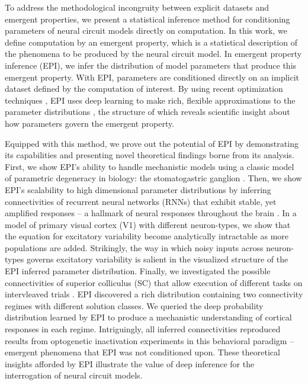 \documentclass[11pt]{article}
\begin{document}
To address the methodological incongruity between explicit datasets and emergent properties, we present a statistical inference method for conditioning parameters of neural circuit models directly on computation.
In this work, we define computation by an emergent property, which is a statistical description of the phenomena to be produced by the neural circuit model.
In emergent property inference (EPI), we infer the distribution of model parameters that produce this emergent property.
With EPI, parameters are conditioned directly on an implicit dataset defined by the computation of interest.
By using recent optimization techniques \cite{loaiza2017maximum}, EPI uses deep learning to make rich, flexible approximations to the parameter distributions \cite{rezende2015variational}, the structure of which reveals scientific insight about how parameters govern the emergent property.

Equipped with this method, we prove out the potential of EPI by demonstrating its capabilities and presenting novel theoretical findings borne from its analysis.
First, we show EPI's ability to handle mechanistic models using a classic model of parametric degeneracy in biology: the stomatogastric ganglion \cite{goldman2001global, gutierrez2013multiple}.
Then, we show EPI's scalability to high dimensional parameter distributions by inferring connectivities of recurrent neural networks (RNNs) that exhibit stable, yet amplified responses -- a hallmark of neural responses throughout the brain \cite{murphy2009balanced, hennequin2014optimal, bondanelli2019population}.
In a model of primary visual cortex (V1) \cite{litwin2016inhibitory, palmigiano2020structure} with different neuron-types, we show that the equation for excitatory variability become analytically intractable as more populations are added.
Strikingly, the way in which noisy inputs across neuron-types governs excitatory variability is salient in the visualized structure of the EPI inferred parameter distribution.
Finally, we investigated the possible connectivities of superior colliculus (SC) that allow execution of different tasks on intervleaved trials \cite{duan2018collicular}.
EPI discovered a rich distribution containing two connectivity regimes with different solution classes.
We queried the deep probability distribution learned by EPI to produce a mechanistic understanding of cortical responses in each regime. 
Intriguingly, all inferred connectivities reproduced results from optogenetic inactivation experiments in this behavioral paradigm -- emergent phenomena that EPI was not conditioned upon.
These theoretical insights afforded by EPI illustrate the value of deep inference for the interrogation of neural circuit models.
\end{document}
